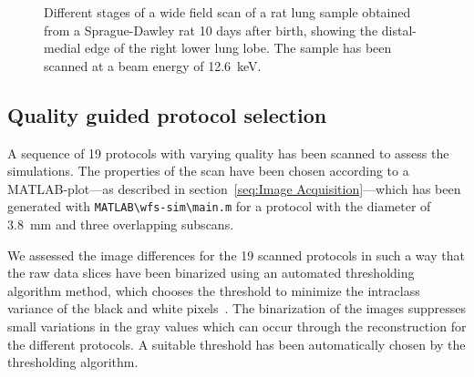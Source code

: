\begin{figure}
{
			\label{fig:merge-rec}
			}
	\caption{Different stages of a wide field scan of a rat lung sample obtained from a Sprague-Dawley rat 10 days after birth, showing the distal-medial edge of the right lower lung lobe. The sample has been scanned at a beam energy of \SI{12.6}{\kilo\electronvolt}.}
	\label{fig:wide field scan results}	
\end{figure}

\subsection{Quality guided protocol selection}
A sequence of 19 protocols with varying quality has been scanned to assess the simulations. The properties of the scan have been chosen according to a MATLAB-plot---as described in section~\ref{seq:Image Acquisition}---which has been generated with \verb+MATLAB\wfs-sim\main.m+  for a protocol with the diameter of \SI{3.8}{mm} and three overlapping subscans.

We assessed the image differences for the 19 scanned protocols in such a way that the raw data slices have been binarized using an automated thresholding algorithm method, which chooses the threshold to minimize the intraclass variance of the black and white pixels~\cite{Otsu1979}. The binarization of the images suppresses small variations in the gray values which can occur through the reconstruction for the different protocols. A suitable threshold has been automatically chosen by the thresholding algorithm.

